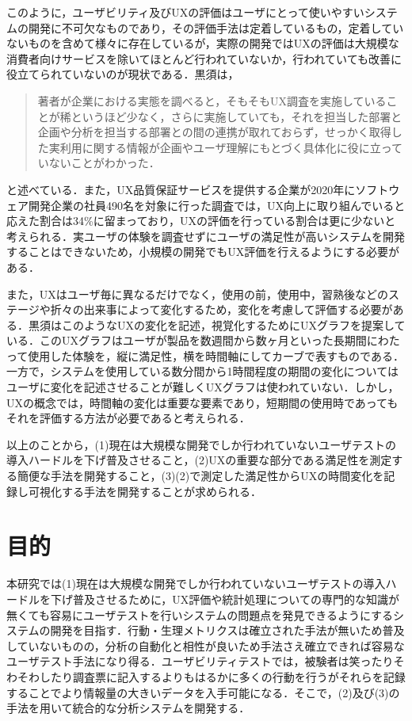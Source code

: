 このように，ユーザビリティ及びUXの評価はユーザにとって使いやすいシステムの開発に不可欠なものであり，その評価手法は定着しているもの，定着していないものを含めて様々に存在しているが，実際の開発ではUXの評価は大規模な消費者向けサービスを除いてほとんど行われていないか，行われていても改善に役立てられていないのが現状である．黒須\cite{kurosu}は，\begin{quotation}
  著者が企業における実態を調べると，そもそもUX調査を実施していることが稀というほど少なく，さらに実施していても，それを担当した部署と企画や分析を担当する部署との間の連携が取れておらず，せっかく取得した実利用に関する情報が企画やユーザ理解にもとづく具体化に役に立っていないことがわかった．
\end{quotation}と述べている．また，UX品質保証サービスを提供する企業が2020年にソフトウェア開発企業の社員490名を対象に行った調査では，UX向上に取り組んでいると応えた割合は34\%に留まっており，UXの評価を行っている割合は更に少ないと考えられる．実ユーザの体験を調査せずにユーザの満足性が高いシステムを開発することはできないため，小規模の開発でもUX評価を行えるようにする必要がある．

また，UXはユーザ毎に異なるだけでなく，使用の前，使用中，習熟後などのステージや折々の出来事によって変化するため，変化を考慮して評価する必要がある\cite{kurosu}．黒須はこのようなUXの変化を記述，視覚化するためにUXグラフ\cite{kurosu2015}を提案している．このUXグラフはユーザが製品を数週間から数ヶ月といった長期間にわたって使用した体験を，縦に満足性，横を時間軸にしてカーブで表すものである．一方で，システムを使用している数分間から1時間程度の期間の変化についてはユーザに変化を記述させることが難しくUXグラフは使われていない．しかし，UXの概念では，時間軸の変化は重要な要素であり，短期間の使用時であってもそれを評価する方法が必要であると考えられる．

以上のことから，(1)現在は大規模な開発でしか行われていないユーザテストの導入ハードルを下げ普及させること，(2)UXの重要な部分である満足性を測定する簡便な手法を開発すること，(3)(2)で測定した満足性からUXの時間変化を記録し可視化する手法を開発することが求められる．


\section{目的}

本研究では(1)現在は大規模な開発でしか行われていないユーザテストの導入ハードルを下げ普及させるために，UX評価や統計処理についての専門的な知識が無くても容易にユーザテストを行いシステムの問題点を発見できるようにするシステムの開発を目指す．行動・生理メトリクスは確立された手法が無いため普及していないものの，分析の自動化と相性が良いため手法さえ確立できれば容易なユーザテスト手法になり得る．ユーザビリティテストでは，被験者は笑ったりそわそわしたり調査票に記入するよりもはるかに多くの行動を行うがそれらを記録することでより情報量の大きいデータを入手可能になる\cite{tullis2014}．そこで，(2)及び(3)の手法を用いて統合的な分析システムを開発する．

